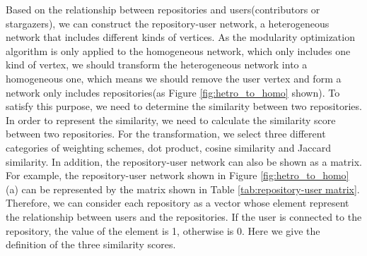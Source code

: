 \documentclass[12pt,oneside,final]{vlsithesis}
\begin{document}
Based on the relationship between repositories and users(contributors or stargazers), we can construct the repository-user network, a heterogeneous network that includes different kinds of vertices. As the modularity optimization algorithm is only applied to the homogeneous network, which only includes one kind of vertex, we should transform the heterogeneous network into a homogeneous one, which means we should remove the user vertex and form a network only includes repositories(as Figure \ref{fig:hetro_to_homo} shown). To satisfy this purpose, we need to determine the similarity between two repositories. In order to represent the similarity, we need to calculate the similarity score between two repositories.  For the transformation, we select three different categories of weighting schemes, dot product, cosine similarity and Jaccard similarity. In addition, the repository-user network can also be shown as a matrix. For example, the repository-user network shown in Figure \ref{fig:hetro_to_homo} (a) can be represented by the matrix shown in Table \ref{tab:repository-user matrix}. Therefore, we can consider each repository as a vector whose element represent the relationship between users and the repositories. If the user is connected to the repository, the value of the element is 1, otherwise is 0. Here we give the definition of the three similarity scores.  
\end{document}
